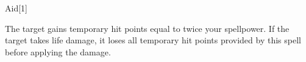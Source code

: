 \begin{spellsection}{Aid}[1]
    \begin{spellheader}
    \end{spellheader}
    \begin{spellcontent}
        \begin{spelltargetinginfo}
        \end{spelltargetinginfo}
        \begin{spelleffects}
            \spelleffect The target gains temporary hit points equal to twice your spellpower.
            If the target takes life damage, it loses all temporary hit points provided by this spell before applying the damage.
            \spelldur \durpersonallong
        \end{spelleffects}
    \end{spellcontent}
    \begin{spellfooter}
        \miscastexplode
    \end{spellfooter}
    \begin{spellaugments}
    \end{spellaugments}
\end{spellsection}

